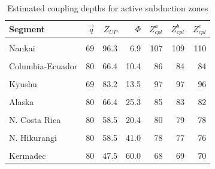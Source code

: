 \begin{table}

\caption{\label{tab:segs}Estimated coupling depths for active subduction zones}
\centering
\begin{threeparttable}
\begin{tabular}[t]{lrrrrrr}
\toprule
Segment & $\vec{q}$ & $Z_{UP}$ & $\Phi$ & $Z_{cpl}^a$ & $Z_{cpl}^b$ & $Z_{cpl}^c$\\
\midrule
\cellcolor{gray!6}{N. Cascadia} & \cellcolor{gray!6}{75} & \cellcolor{gray!6}{74.2} & \cellcolor{gray!6}{3.4} & \cellcolor{gray!6}{92} & \cellcolor{gray!6}{91} & \cellcolor{gray!6}{90}\\
Nankai & 69 & 96.3 & 6.9 & 107 & 109 & 110\\
\cellcolor{gray!6}{Mexico} & \cellcolor{gray!6}{72} & \cellcolor{gray!6}{98.1} & \cellcolor{gray!6}{7.2} & \cellcolor{gray!6}{108} & \cellcolor{gray!6}{111} & \cellcolor{gray!6}{112}\\
Columbia-Ecuador & 80 & 66.4 & 10.4 & 86 & 84 & 84\\
\cellcolor{gray!6}{S.C. Chile} & \cellcolor{gray!6}{80} & \cellcolor{gray!6}{66.4} & \cellcolor{gray!6}{20.0} & \cellcolor{gray!6}{85} & \cellcolor{gray!6}{84} & \cellcolor{gray!6}{83}\\
\addlinespace
Kyushu & 69 & 83.2 & 13.5 & 97 & 97 & 96\\
\cellcolor{gray!6}{N. Sumatra} & \cellcolor{gray!6}{120} & \cellcolor{gray!6}{26.8} & \cellcolor{gray!6}{25.0} & \cellcolor{gray!6}{57} & \cellcolor{gray!6}{65} & \cellcolor{gray!6}{68}\\
Alaska & 80 & 66.4 & 25.3 & 85 & 83 & 82\\
\cellcolor{gray!6}{N. Chile} & \cellcolor{gray!6}{85} & \cellcolor{gray!6}{58.7} & \cellcolor{gray!6}{38.4} & \cellcolor{gray!6}{78} & \cellcolor{gray!6}{77} & \cellcolor{gray!6}{77}\\
N. Costa Rica & 80 & 58.5 & 20.4 & 80 & 79 & 78\\
\addlinespace
\cellcolor{gray!6}{Aleutians} & \cellcolor{gray!6}{75} & \cellcolor{gray!6}{51.6} & \cellcolor{gray!6}{39.6} & \cellcolor{gray!6}{73} & \cellcolor{gray!6}{73} & \cellcolor{gray!6}{73}\\
N. Hikurangi & 80 & 58.5 & 41.0 & 78 & 77 & 76\\
\cellcolor{gray!6}{Mariana} & \cellcolor{gray!6}{80} & \cellcolor{gray!6}{47.5} & \cellcolor{gray!6}{54.6} & \cellcolor{gray!6}{69} & \cellcolor{gray!6}{70} & \cellcolor{gray!6}{70}\\
Kermadec & 80 & 47.5 & 60.0 & 68 & 69 & 70\\

\end{tabular}
\end{threeparttable}
\end{table}
